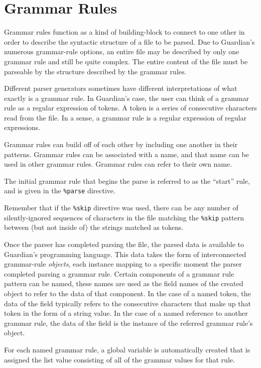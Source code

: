 

\section{Grammar Rules}
{
	Grammar rules function as a kind of building-block to connect to one
	other in order to describe the syntactic structure of a file to be parsed.
	Due to Guardian's numerous grammar-rule options, an entire file
	may be described by only one grammar rule and still be quite
	complex.
	The entire content of the file must be parseable by
	the structure described by the grammar rules.
	
	Different parser generators sometimes have different interpretations of
	what exactly is a grammar rule. In Guardian's case, the user can think
	of a grammar rule as a regular expression of tokens. A token is a series of
	consecutive characters read from the file.
	In a sense, a grammar rule is a regular expression of regular expressions.
	
	Grammar rules can build off of each other by including one another in their
	patterns.
	Grammar rules can be associated with a name, and that name can be used in
	other grammar rules. Grammar rules can refer to their own name.
	
	The initial grammar rule that begins the parse is referred to as the
	``start'' rule, and is given in the \texttt{\%parse} directive.
	
	Remember that if the \texttt{\%skip} directive was used, there can be
	any number of silently-ignored sequences of characters in the file matching
	the \texttt{\%skip} pattern between
	(but not inside of) the strings matched as tokens.
	
	Once the parser has completed parsing the file, the parsed data is available
	to Guardian's programming language. This data takes the form of
	interconnected grammar-rule \textit{objects}, each instance mapping to a
	specific moment the parser completed parsing a grammar rule.
	Certain components of a grammar rule pattern can be named, these names
	are used as the field names of the created object to refer to the data of
	that component. In the case of a named token, the data of the field typically
	refers to the consecutive characters that make up that token in the form
	of a string value.
	In the case of a named reference to another grammar rule, the data of the
	field is the instance of the referred grammar rule's object.
	
	For each named grammar rule, a global variable is automatically created
	that is assigned the list value consisting of all of the grammar values
	for that rule.
	
}
